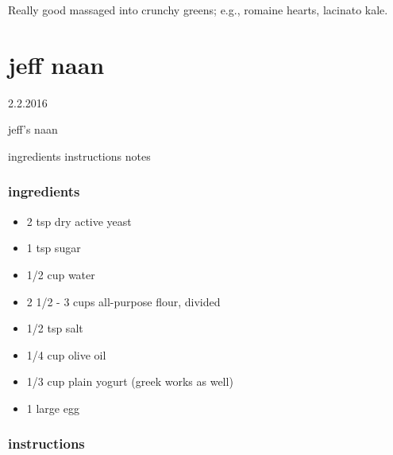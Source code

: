 \documentclass[]{book}
\providecommand{\tightlist}{%
  \setlength{\itemsep}{0pt}\setlength{\parskip}{0pt}}
\begin{document}
Really good massaged into crunchy greens; e.g., romaine hearts, lacinato kale.

\hypertarget{jeff-naan}{%
\chapter{jeff naan}\label{jeff-naan}}

2.2.2016

jeff's naan

ingredients \textbar{}
instructions \textbar{}
notes

\hypertarget{ingredients-27}{%
\subsection{ingredients}\label{ingredients-27}}

\begin{itemize}
\tightlist
\item
  2 tsp dry active yeast
\item
  1 tsp sugar
\item
  1/2 cup water
\item
  2 1/2 - 3 cups all-purpose flour, divided
\item
  1/2 tsp salt
\item
  1/4 cup olive oil
\item
  1/3 cup plain yogurt (greek works as well)
\item
  1 large egg
\end{itemize}

\hypertarget{instructions-27}{%
\subsection{instructions}\label{instructions-27}}
\end{document}
